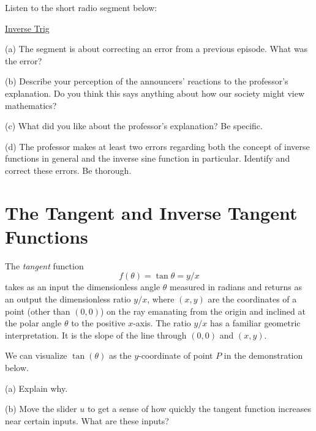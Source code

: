 \documentclass{ximera}
\begin{document}
\begin{question} \label{Q8:Inverses}

Listen to the short radio segment below:

\href{https://www.npr.org/2023/04/02/1167645463/sunday-puzzle-correction-a-
lesson-in-trigonometry}{Inverse Trig}


(a) The segment is about correcting an error from a previous episode. What was the error?


(b) Describe your perception of the announcers’ reactions to the professor’s explanation. Do you think this says anything about how our society might view mathematics?

(c) What did you like about the professor’s explanation? Be specific.

(d) The professor makes at least two errors regarding both the concept of inverse functions in general and the inverse sine function in particular. Identify and correct these errors. Be thorough.

\end{question}

\section{The Tangent and Inverse Tangent Functions}

The \emph{tangent} function 
\[
   f(\theta) = \tan \theta = y/x
\]
takes as an input the dimensionless angle $\theta$ measured in radians and returns as an output the dimensionless ratio $y/x$, where $(x,y)$ are the coordinates of a point (other than $(0,0)$) on the ray emanating from the origin and inclined at the polar angle $\theta$ to the positive $x$-axis. The ratio $y/x$ has a familiar geometric interpretation. It is the slope of the line through $(0,0)$ and $(x,y)$. 

\begin{exploration}\label{Exp3:Comp}
We can visualize $\tan(\theta)$ as the $y$-coordinate of point $P$ in the demonstration below. 
\begin{question} \label{Qetgfgyyy5} 
(a) Explain why.

(b) Move the slider $u$ to get a sense of how quickly the tangent function increases near certain inputs. What are these inputs?
\end{question}


 
\begin{onlineOnly}
    \begin{center}
\end{center}
\end{onlineOnly}
\end{exploration}
\end{document}

